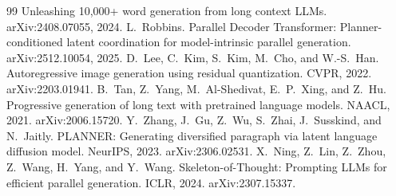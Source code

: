\documentclass[10pt,twocolumn]{article}
\begin{document}
\begin{thebibliography}{99}
  Unleashing 10,000+ word generation from long context LLMs. arXiv:2408.07055, 2024.
 L.~Robbins. Parallel Decoder Transformer: Planner-conditioned latent coordination for model-intrinsic
  parallel generation. arXiv:2512.10054, 2025.
 D.~Lee, C.~Kim, S.~Kim, M.~Cho, and W.-S.~Han. Autoregressive image generation using
  residual quantization. CVPR, 2022. arXiv:2203.01941.
 B.~Tan, Z.~Yang, M.~Al-Shedivat, E.~P.~Xing, and Z.~Hu. Progressive generation of long text
  with pretrained language models. NAACL, 2021. arXiv:2006.15720.
 Y.~Zhang, J.~Gu, Z.~Wu, S.~Zhai, J.~Susskind, and N.~Jaitly. PLANNER: Generating diversified
  paragraph via latent language diffusion model. NeurIPS, 2023. arXiv:2306.02531.
 X.~Ning, Z.~Lin, Z.~Zhou, Z.~Wang, H.~Yang, and Y.~Wang. Skeleton-of-Thought: Prompting LLMs for
  efficient parallel generation. ICLR, 2024. arXiv:2307.15337.
\end{thebibliography}

\onecolumn
\appendix


\end{document}
